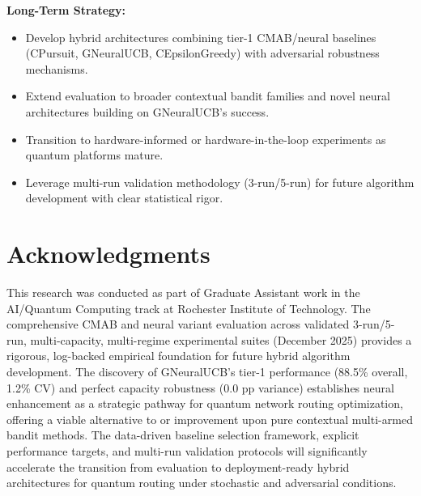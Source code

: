 \documentclass[12pt,a4paper]{article}
\begin{document}
\textbf{Long-Term Strategy:}
\begin{itemize}
\item Develop hybrid architectures combining tier-1 CMAB/neural baselines (CPursuit, GNeuralUCB, CEpsilonGreedy) with adversarial robustness mechanisms.
\item Extend evaluation to broader contextual bandit families and novel neural architectures building on GNeuralUCB's success.
\item Transition to hardware-informed or hardware-in-the-loop experiments as quantum platforms mature.
\item Leverage multi-run validation methodology (3-run/5-run) for future algorithm development with clear statistical rigor.
\end{itemize}

\section{Acknowledgments}

This research was conducted as part of Graduate Assistant work in the AI/Quantum Computing track at Rochester Institute of Technology. The comprehensive CMAB and neural variant evaluation across validated 3-run/5-run, multi-capacity, multi-regime experimental suites (December 2025) provides a rigorous, log-backed empirical foundation for future hybrid algorithm development. The discovery of GNeuralUCB's tier-1 performance (88.5\% overall, 1.2\% CV) and perfect capacity robustness (0.0 pp variance) establishes neural enhancement as a strategic pathway for quantum network routing optimization, offering a viable alternative to or improvement upon pure contextual multi-armed bandit methods. The data-driven baseline selection framework, explicit performance targets, and multi-run validation protocols will significantly accelerate the transition from evaluation to deployment-ready hybrid architectures for quantum routing under stochastic and adversarial conditions.
\end{document}

